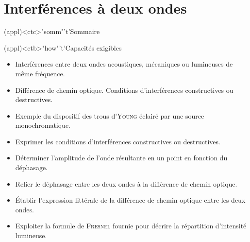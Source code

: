 \documentclass[../../main/main.tex]{subfiles}
\begin{document}
\setcounter{chapter}{1}


\chapter{Interférences à deux ondes}

\vspace*{\fill}

\begin{tcn}(appl)<ctc>"somm"'t'{Sommaire}
	\let\item\olditem
	\vspace{-15pt}
	\minitoc
	\vspace{-25pt}
\end{tcn}

\begin{tcn}[sidebyside]
	(appl)<ctb>"how"'t'{Capacités exigibles}
	\begin{itemize}[label=\rcheck]
		\item Interférences entre deux ondes acoustiques, mécaniques ou lumineuses
		      de même fréquence.
		\item Différence de chemin optique. Conditions d'interférences
		      constructives ou destructives.
		\item Exemple du dispositif des trous d'\textsc{Young} éclairé par une source
		      monochromatique.
		\item Exprimer les conditions d'interférences constructives ou
		      destructives.
	\end{itemize}
	\tcblower
	\begin{itemize}[label=\rcheck]
		\item Déterminer l'amplitude de l'onde résultante en un point en fonction
		      du déphasage.
		\item Relier le déphasage entre les deux ondes à la différence de chemin
		      optique.
		\item Établir l'expression littérale de la différence de chemin optique
		      entre les deux ondes.
		\item Exploiter la formule de \textsc{Fresnel} fournie pour décrire la
		      répartition d'intensité lumineuse.
	\end{itemize}
\end{tcn}

\vspace*{\fill}
\newpage
\vspace*{\fill}
\end{document}
